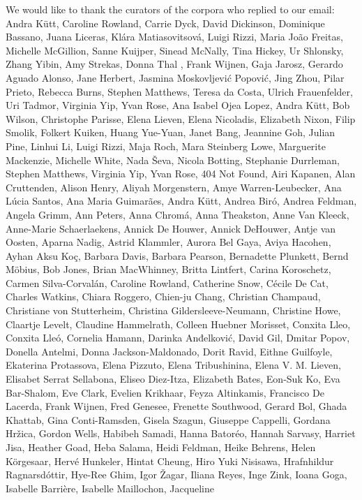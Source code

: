\documentclass[
]{article}
\begin{document}
We would like to thank the curators of the corpora who replied to our
email: Andra Kütt, Caroline Rowland, Carrie Dyck, David Dickinson,
Dominique Bassano, Juana Liceras, Klára Matiasovitsová, Luigi Rizzi,
Maria João Freitas, Michelle McGillion, Sanne Kuijper, Sinead McNally,
Tina Hickey, Ur Shlonsky, Zhang Yibin, Amy Strekas, Donna Thal , Frank
Wijnen, Gaja Jarosz, Gerardo Aguado Alonso, Jane Herbert, Jasmina
Moskovljević Popović, Jing Zhou, Pilar Prieto, Rebecca Burns, Stephen
Matthews, Teresa da Costa, Ulrich Frauenfelder, Uri Tadmor, Virginia
Yip, Yvan Rose, Ana Isabel Ojea Lopez, Andra Kütt, Bob Wilson,
Christophe Parisse, Elena Lieven, Elena Nicoladis, Elizabeth Nixon,
Filip Smolik, Folkert Kuiken, Huang Yue-Yuan, Janet Bang, Jeannine Goh,
Julian Pine, Linhui Li, Luigi Rizzi, Maja Roch, Mara Steinberg Lowe,
Marguerite Mackenzie, Michelle White, Nada Ševa, Nicola Botting,
Stephanie Durrleman, Stephen Matthews, Virginia Yip, Yvan Rose, 404 Not
Found, Airi Kapanen, Alan Cruttenden, Alison Henry, Aliyah Morgenstern,
Amye Warren-Leubecker, Ana Lúcia Santos, Ana Maria Guimarães, Andra
Kütt, Andrea Biró, Andrea Feldman, Angela Grimm, Ann Peters, Anna
Chromá, Anna Theakston, Anne Van Kleeck, Anne-Marie Schaerlaekens,
Annick De Houwer, Annick DeHouwer, Antje van Oosten, Aparna Nadig,
Astrid Klammler, Aurora Bel Gaya, Aviya Hacohen, Ayhan Aksu Koç, Barbara
Davis, Barbara Pearson, Bernadette Plunkett, Bernd Möbius, Bob Jones,
Brian MacWhinney, Britta Lintfert, Carina Koroschetz, Carmen
Silva-Corvalán, Caroline Rowland, Catherine Snow, Cécile De Cat, Charles
Watkins, Chiara Roggero, Chien-ju Chang, Christian Champaud, Christiane
von Stutterheim, Christina Gildersleeve-Neumann, Christine Howe,
Claartje Levelt, Claudine Hammelrath, Colleen Huebner Morisset, Conxita
Lleo, Conxita Lleó, Cornelia Hamann, Darinka Anđelković, David Gil,
Dmitar Popov, Donella Antelmi, Donna Jackson-Maldonado, Dorit Ravid,
Eithne Guilfoyle, Ekaterina Protassova, Elena Pizzuto, Elena
Tribushinina, Elena V. M. Lieven, Elisabet Serrat Sellabona, Eliseo
Diez-Itza, Elizabeth Bates, Eon-Suk Ko, Eva Bar-Shalom, Eve Clark,
Evelien Krikhaar, Feyza Altinkamis, Francisco De Lacerda, Frank Wijnen,
Fred Genesee, Frenette Southwood, Gerard Bol, Ghada Khattab, Gina
Conti-Ramsden, Gisela Szagun, Giuseppe Cappelli, Gordana Hržica, Gordon
Wells, Habibeh Samadi, Hanna Batoréo, Hannah Sarvasy, Harriet Jisa,
Heather Goad, Heba Salama, Heidi Feldman, Heike Behrens, Helen
Körgesaar, Hervé Hunkeler, Hintat Cheung, Hiro Yuki Nisisawa,
Hrafnhildur Ragnarsdóttir, Hye-Ree Ghim, Igor Žagar, Iliana Reyes, Inge
Zink, Ioana Goga, Isabelle Barrière, Isabelle Maillochon, Jacqueline
\end{document}
